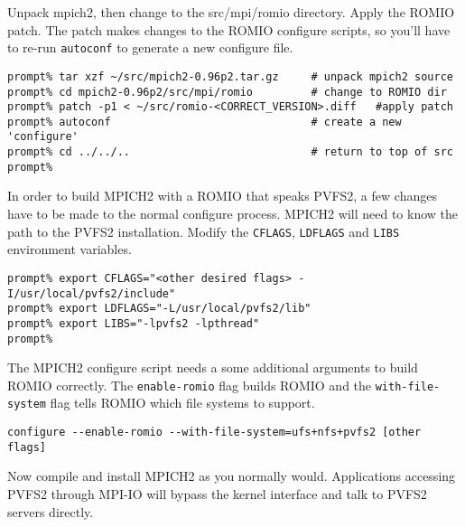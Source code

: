 \documentclass[11pt, letterpaper]{article}
\begin{document}
Unpack mpich2, then change to the src/mpi/romio directory.  Apply the
ROMIO patch.  The patch makes changes to the ROMIO configure scripts, so you'll have to re-run {\tt autoconf} to generate a new configure file.

\begin{verbatim}
prompt% tar xzf ~/src/mpich2-0.96p2.tar.gz     # unpack mpich2 source
prompt% cd mpich2-0.96p2/src/mpi/romio         # change to ROMIO dir
prompt% patch -p1 < ~/src/romio-<CORRECT_VERSION>.diff   #apply patch
prompt% autoconf                               # create a new 'configure'
prompt% cd ../../..                            # return to top of src
prompt% 
\end{verbatim}

In order to build MPICH2 with a ROMIO that speaks PVFS2, a few changes
have to be made to the normal configure process.  MPICH2 will need to
know the path to the PVFS2 installation.  Modify the {\tt CFLAGS},
{\tt LDFLAGS} and {\tt LIBS} environment variables.

\begin{verbatim}
prompt% export CFLAGS="<other desired flags> -I/usr/local/pvfs2/include"
prompt% export LDFLAGS="-L/usr/local/pvfs2/lib"
prompt% export LIBS="-lpvfs2 -lpthread"
prompt%
\end{verbatim}

The MPICH2 configure script needs a some additional arguments to build
ROMIO correctly.  The {\tt enable-romio} flag builds ROMIO and  the
{\tt with-file-system} flag tells ROMIO which file systems to support. 

\begin{verbatim}
configure --enable-romio --with-file-system=ufs+nfs+pvfs2 [other flags]
\end{verbatim}

Now compile and install MPICH2 as you normally would.  Applications accessing
PVFS2 through MPI-IO will bypass the kernel interface and talk to PVFS2 servers directly.  
\end{document}
